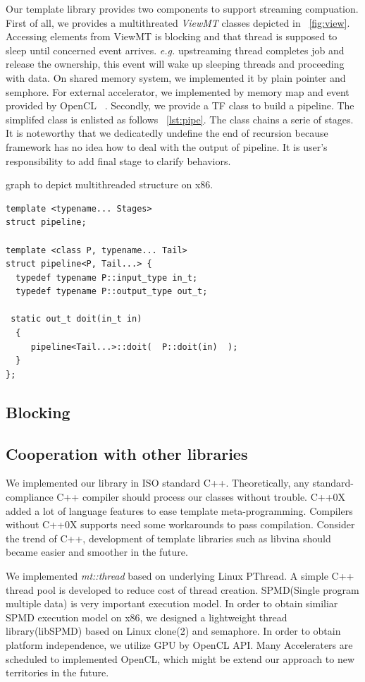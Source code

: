\documentclass[10pt, conference, compsocconf]{IEEEtran}
\begin{document}
Our template library provides two components to support streaming compuation. First of all, we provides a multithreated \emph{ViewMT} classes depicted in ~\ref{fig:view}. Accessing elements from ViewMT is blocking and that thread is supposed to sleep until concerned event arrives. \textit{e.g.} upstreaming thread completes job and release the ownership, this event will wake up sleeping threads and proceeding with data. On shared memory system, we implemented it by plain pointer and semphore. For external accelerator, we implemented by memory map and event provided by OpenCL ~\cite{b12}. Secondly, we provide a TF class to build a pipeline. The simplifed class is enlisted as follows ~\ref{lst:pipe}. The class chains a serie of stages. It is noteworthy that we dedicatedly undefine the end of recursion because framework has no idea how to deal with the output of pipeline. It is user's responsibility to add final stage to clarify behaviors. 

graph to depict multithreaded structure on x86. 

\begin{verbatim}
template <typename... Stages>
struct pipeline;

template <class P, typename... Tail>
struct pipeline<P, Tail...> {
  typedef typename P::input_type in_t;
  typedef typename P::output_type out_t;
 
 static out_t doit(in_t in)
  {
     pipeline<Tail...>::doit(  P::doit(in)  );
  }
};  
\end{verbatim}
\subsection{Blocking}
\subsection{Cooperation with other libraries}
We implemented our library in ISO standard C++. Theoretically, any standard-compliance C++ compiler should process our classes without trouble. C++0X \cite{b17} added a lot of language features to ease template meta-programming. Compilers without C++0X supports need some workarounds to pass compilation. Consider the trend of C++, development of template libraries such as libvina should became easier and smoother in the future. 

We implemented \emph{mt::thread} based on underlying Linux PThread. A simple C++ thread pool is developed to reduce cost of thread creation. SPMD(Single program multiple data) is very important execution model. In order to obtain similiar SPMD execution model on x86, we designed a lightweight thread library(libSPMD) based on Linux clone(2) and semaphore. In order to obtain platform independence, we utilize GPU by OpenCL API. Many Acceleraters are scheduled to implemented OpenCL, which might be extend our approach to new territories in the future. 
 
\end{document}
